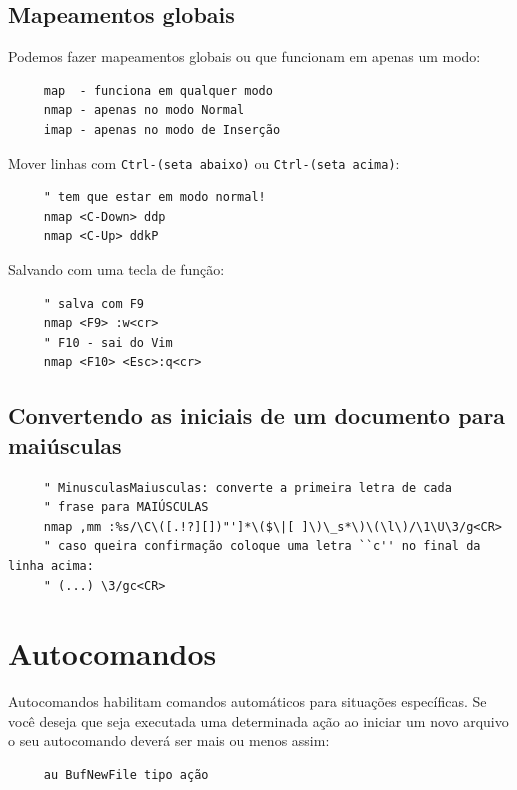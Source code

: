 \documentclass[10pt,a4paper,openany]{book}
\begin{document}
\subsection{Mapeamentos globais}


Podemos fazer mapeamentos globais ou que funcionam em apenas um modo:

\begin{verbatim}
     map  - funciona em qualquer modo
     nmap - apenas no modo Normal
     imap - apenas no modo de Inserção
\end{verbatim}

Mover linhas com {\tt Ctrl-(seta abaixo)} ou {\tt Ctrl-(seta acima)}:

\begin{verbatim}
     " tem que estar em modo normal!
     nmap <C-Down> ddp
     nmap <C-Up> ddkP
\end{verbatim}

Salvando com uma tecla de função:

\begin{verbatim}
     " salva com F9
     nmap <F9> :w<cr>
     " F10 - sai do Vim
     nmap <F10> <Esc>:q<cr>
\end{verbatim}

\subsection{Convertendo as iniciais de um documento para maiúsculas}
\label{Convertendo as iniciais de um documento para maiúsculas}

\begin{verbatim}
     " MinusculasMaiusculas: converte a primeira letra de cada
     " frase para MAIÚSCULAS
     nmap ,mm :%s/\C\([.!?][])"']*\($\|[ ]\)\_s*\)\(\l\)/\1\U\3/g<CR>
     " caso queira confirmação coloque uma letra ``c'' no final da linha acima:
     " (...) \3/gc<CR>
\end{verbatim}

\section{Autocomandos }\label{Autocomandos }

Autocomandos habilitam comandos automáticos para situações
específicas. Se você deseja que seja executada uma determinada ação ao
iniciar um novo arquivo o seu autocomando deverá ser mais ou menos
assim:

\begin{verbatim}
     au BufNewFile tipo ação
\end{verbatim}
\end{document}
